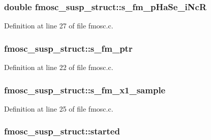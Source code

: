 \subsubsection[{\texorpdfstring{s\+\_\+fm\+\_\+p\+Ha\+Se\+\_\+i\+NcR}{s_fm_pHaSe_iNcR}}]{\setlength{\rightskip}{0pt plus 5cm}double fmosc\+\_\+susp\+\_\+struct\+::s\+\_\+fm\+\_\+p\+Ha\+Se\+\_\+i\+NcR}\hypertarget{structfmosc__susp__struct_a4ed0b45d7f2e03d47e549f5d63589117}{}\label{structfmosc__susp__struct_a4ed0b45d7f2e03d47e549f5d63589117}


Definition at line 27 of file fmosc.\+c.

\subsubsection[{\texorpdfstring{s\+\_\+fm\+\_\+ptr}{s_fm_ptr}}]{ fmosc\+\_\+susp\+\_\+struct\+::s\+\_\+fm\+\_\+ptr}\hypertarget{structfmosc__susp__struct_a8c6aa6c4681f9671e23c8134791267f2}{}\label{structfmosc__susp__struct_a8c6aa6c4681f9671e23c8134791267f2}


Definition at line 22 of file fmosc.\+c.

\subsubsection[{\texorpdfstring{s\+\_\+fm\+\_\+x1\+\_\+sample}{s_fm_x1_sample}}]{ fmosc\+\_\+susp\+\_\+struct\+::s\+\_\+fm\+\_\+x1\+\_\+sample}\hypertarget{structfmosc__susp__struct_a59f0f62833b10e99df2a6f62d874d1b1}{}\label{structfmosc__susp__struct_a59f0f62833b10e99df2a6f62d874d1b1}


Definition at line 25 of file fmosc.\+c.

\subsubsection[{\texorpdfstring{started}{started}}]{ fmosc\+\_\+susp\+\_\+struct\+::started}\hypertarget{structfmosc__susp__struct_a953ece351b2ca0464cfdd697775c52ac}{}\label{structfmosc__susp__struct_a953ece351b2ca0464cfdd697775c52ac}


